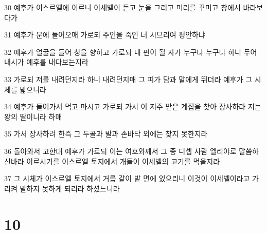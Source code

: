 \par 30 예후가 이스르엘에 이르니 이세벨이 듣고 눈을 그리고 머리를 꾸미고 창에서 바라보다가
\par 31 예후가 문에 들어오매 가로되 주인을 죽인 너 시므리여 평안하냐
\par 32 예후가 얼굴을 들어 창을 향하고 가로되 내 펀이 될 자가 누구냐 누구냐 하니 두어 내시가 예후를 내다보는지라
\par 33 가로되 저를 내려던지라 하니 내려던지매 그 피가 담과 말에게 뛰더라 예후가 그 시체를 밟으니라
\par 34 예후가 들어가서 먹고 마시고 가로되 가서 이 저주 받은 계집을 찾아 장사하라 저는 왕의 딸이니라 하매
\par 35 가서 장사하려 한즉 그 두골과 발과 손바닥 외에는 찾지 못한지라
\par 36 돌아와서 고한대 예후가 가로되 이는 여호와께서 그 종 디셉 사람 엘리야로 말씀하신바라 이르시기를 이스르엘 토지에서 개들이 이세벨의 고기를 먹을지라
\par 37 그 시체가 이스르엘 토지에서 거름 같이 밭 면에 있으리니 이것이 이세벨이라고 가리켜 말하지 못하게 되리라 하셨느니라

\chapter{10}

